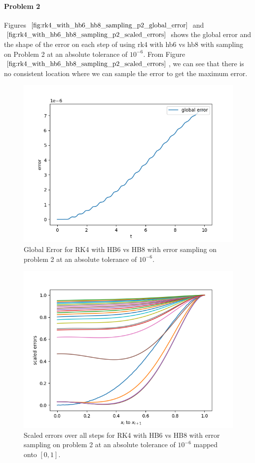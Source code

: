 \paragraph{Problem 2} Figures $\ref{fig:rk4_with_hb6_hb8_sampling_p2_global_error}$ and $\ref{fig:rk4_with_hb6_hb8_sampling_p2_scaled_errors}$ shows the global error and the shape of the error on each step of using rk4 with hb6 vs hb8 with sampling on Problem 2 at an absolute tolerance of $10^{-6}$. From Figure $\ref{fig:rk4_with_hb6_hb8_sampling_p2_scaled_errors}$, we can see that there is no consistent location where we can sample the error to get the maximum error.

\begin{figure}[H]
\centering
\includegraphics[width=0.7\linewidth]{./figures/rk4_with_hb6_hb8_sampling_p2_global_error}
\caption{Global Error for RK4 with HB6 vs HB8 with error sampling on problem 2 at an absolute tolerance of $10^{-6}$.}
\label{fig:rk4_with_hb6_hb8_sampling_p2_global_error}
\end{figure}

\begin{figure}[H]
\centering
\includegraphics[width=0.7\linewidth]{./figures/rk4_with_hb6_hb8_sampling_p2_scaled_errors}
\caption{Scaled errors over all steps for RK4 with HB6 vs HB8 with error sampling on problem 2 at an absolute tolerance of $10^{-6}$ mapped onto $[0, 1]$.}
\label{fig:rk4_with_hb6_hb8_sampling_p2_scaled_errors}
\end{figure}

